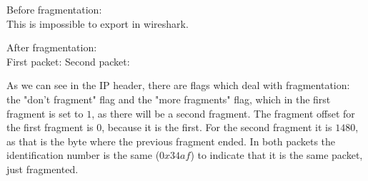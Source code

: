 Before fragmentation:\\
This is impossible to export in wireshark.

After fragmentation:\\
First packet: 
Second packet: 

As we can see in the IP header, there are flags which deal with fragmentation: the "don't fragment" flag and the "more fragments" flag, which in the first fragment is set to $1$, as there will be a second fragment. The fragment offset for the first fragment is $0$, because it is the first. For the second fragment it is $1480$, as that is the byte where the previous fragment ended. In both packets the identification number is the same ($0x34af$) to indicate that it is the same packet, just fragmented.